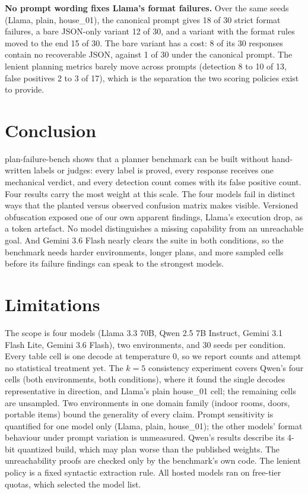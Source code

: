 \documentclass[10pt]{article}
\newcommand{\benchname}{plan-failure-bench}
\begin{document}
\textbf{No prompt wording fixes Llama's format failures.} Over the same
seeds (Llama, plain, house\_01), the canonical prompt gives 18 of 30
strict format failures, a bare JSON-only variant 12 of 30, and a
variant with the format rules moved to the end 15 of 30. The bare
variant has a cost: 8 of its 30 responses contain no recoverable JSON,
against 1 of 30 under the canonical prompt. The lenient planning
metrics barely move across prompts (detection 8 to 10 of 13, false
positives 2 to 3 of 17), which is the separation the two scoring
policies exist to provide.

\section{Conclusion}

\benchname{} shows that a planner benchmark can be built without
hand-written labels or judges: every label is proved, every response
receives one mechanical verdict, and every detection count comes with
its false positive count. Four results carry the most weight at this
scale. The four models fail in distinct ways that the planted versus
observed confusion matrix makes visible. Versioned obfuscation exposed
one of our own apparent findings, Llama's execution drop, as a token
artefact. No model distinguishes a missing capability from an
unreachable goal. And Gemini 3.6 Flash nearly clears the suite in both
conditions, so the benchmark needs harder environments, longer plans,
and more sampled cells before its failure findings can speak to the
strongest models.

\section{Limitations}

The scope is four models (Llama 3.3 70B, Qwen 2.5 7B Instruct, Gemini
3.1 Flash Lite, Gemini 3.6 Flash), two environments, and 30 seeds per
condition. Every table cell is one decode at temperature 0, so we
report counts and attempt no statistical treatment yet. The $k=5$ consistency
experiment covers Qwen's four cells (both environments, both
conditions), where it found the single decodes representative in
direction, and Llama's plain house\_01 cell; the remaining cells are
unsampled. Two environments in one domain
family (indoor rooms, doors, portable items) bound the generality of
every claim. Prompt sensitivity is quantified for one model only (Llama, plain,
house\_01); the other models' format behaviour under prompt variation
is unmeasured. Qwen's results describe its
4-bit quantized build, which may plan worse than the published
weights. The unreachability proofs are checked only by the benchmark's
own code. The lenient policy is a fixed syntactic extraction rule. All
hosted models ran
on free-tier quotas, which selected the model list.
\end{document}
